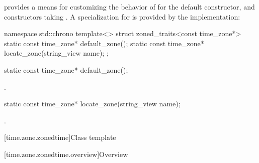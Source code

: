 \pnum
{} provides a means for customizing
the behavior of 
for the  default constructor,
and constructors taking .
A specialization for  is provided by the implementation:

\begin{codeblock}
namespace std::chrono {
  template<> struct zoned_traits<const time_zone*> {
    static const time_zone* default_zone();
    static const time_zone* locate_zone(string_view name);
  };
}
\end{codeblock}

%
\begin{itemdecl}
static const time_zone* default_zone();
\end{itemdecl}

\begin{itemdescr}
\pnum
\returns
{}.
\end{itemdescr}

%
\begin{itemdecl}
static const time_zone* locate_zone(string_view name);
\end{itemdecl}

\begin{itemdescr}
\pnum
\returns
{}.
\end{itemdescr}

[time.zone.zonedtime]{Class template }

[time.zone.zonedtime.overview]{Overview}


